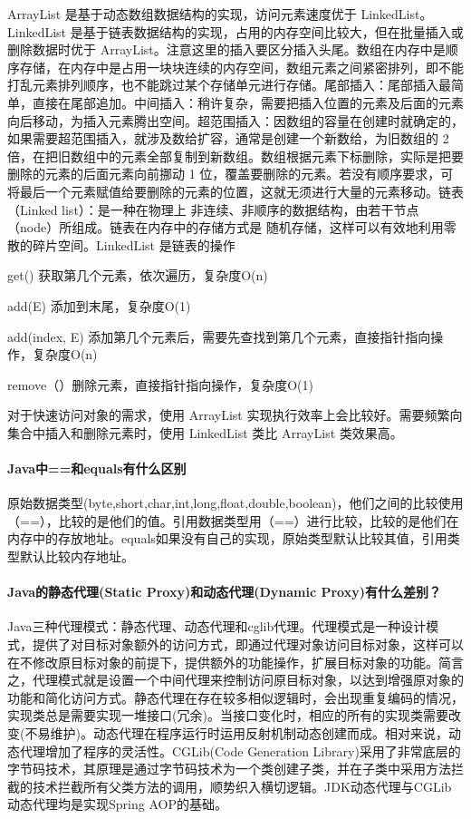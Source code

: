 \documentclass[../../../interview-questions.tex]{subfiles}
\begin{document}
ArrayList 是基于动态数组数据结构的实现，访问元素速度优于 LinkedList。LinkedList 是基于链表数据结构的实现，占用的内存空间比较大，但在批量插入或删除数据时优于 ArrayList。注意这里的插入要区分插入头尾。数组在内存中是顺序存储，在内存中是占用一块块连续的内存空间，数组元素之间紧密排列，即不能打乱元素排列顺序，也不能跳过某个存储单元进行存储。尾部插入：尾部插入最简单，直接在尾部追加。中间插入：稍许复杂，需要把插入位置的元素及后面的元素向后移动，为插入元素腾出空间。超范围插入：因数组的容量在创建时就确定的，如果需要超范围插入，就涉及数给扩容，通常是创建一个新数给，为旧数组的 2 倍，在把旧数组中的元素全部复制到新数组。数组根据元素下标删除，实际是把要删除的元素的后面元素向前挪动 1 位，覆盖要删除的元素。若没有顺序要求，可将最后一个元素赋值给要删除的元素的位置，这就无须进行大量的元素移动。链表（Linked list）：是一种在物理上 非连续、非顺序的数据结构，由若干节点（node）所组成。链表在内存中的存储方式是 随机存储，这样可以有效地利用零散的碎片空间。LinkedList 是链表的操作

get() 获取第几个元素，依次遍历，复杂度O(n)

add(E) 添加到末尾，复杂度O(1)

add(index, E) 添加第几个元素后，需要先查找到第几个元素，直接指针指向操作，复杂度O(n)

remove（）删除元素，直接指针指向操作，复杂度O(1)

对于快速访问对象的需求，使用 ArrayList 实现执行效率上会比较好。需要频繁向集合中插入和删除元素时，使用 LinkedList 类比 ArrayList 类效果高。

\paragraph{Java中==和equals有什么区别}

原始数据类型(byte,short,char,int,long,float,double,boolean)，他们之间的比较使用（==），比较的是他们的值。引用数据类型用（==）进行比较，比较的是他们在内存中的存放地址。equals如果没有自己的实现，原始类型默认比较其值，引用类型默认比较内存地址。

\paragraph{Java的静态代理(Static Proxy)和动态代理(Dynamic Proxy)有什么差别？}

Java三种代理模式：静态代理、动态代理和cglib代理。代理模式是一种设计模式，提供了对目标对象额外的访问方式，即通过代理对象访问目标对象，这样可以在不修改原目标对象的前提下，提供额外的功能操作，扩展目标对象的功能。简言之，代理模式就是设置一个中间代理来控制访问原目标对象，以达到增强原对象的功能和简化访问方式。静态代理在存在较多相似逻辑时，会出现重复编码的情况，实现类总是需要实现一堆接口(冗余)。当接口变化时，相应的所有的实现类需要改变(不易维护)。动态代理在程序运行时运用反射机制动态创建而成。相对来说，动态代理增加了程序的灵活性。CGLib(Code Generation Library)采用了非常底层的字节码技术，其原理是通过字节码技术为一个类创建子类，并在子类中采用方法拦截的技术拦截所有父类方法的调用，顺势织入横切逻辑。JDK动态代理与CGLib动态代理均是实现Spring AOP的基础。
\end{document}

